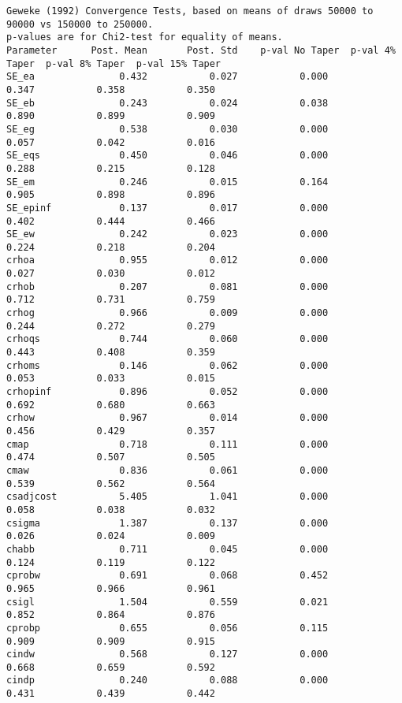 \documentclass[]{article}
\begin{document}
\begin{verbatim}
Geweke (1992) Convergence Tests, based on means of draws 50000 to 90000 vs 150000 to 250000.
p-values are for Chi2-test for equality of means.
Parameter 	   Post. Mean 	    Post. Std 	 p-val No Taper	 p-val 4% Taper	 p-val 8% Taper	 p-val 15% Taper
SE_ea      	        0.432 	        0.027 	        0.000	        0.347	        0.358	        0.350
SE_eb      	        0.243 	        0.024 	        0.038	        0.890	        0.899	        0.909
SE_eg      	        0.538 	        0.030 	        0.000	        0.057	        0.042	        0.016
SE_eqs     	        0.450 	        0.046 	        0.000	        0.288	        0.215	        0.128
SE_em      	        0.246 	        0.015 	        0.164	        0.905	        0.898	        0.896
SE_epinf   	        0.137 	        0.017 	        0.000	        0.402	        0.444	        0.466
SE_ew      	        0.242 	        0.023 	        0.000	        0.224	        0.218	        0.204
crhoa      	        0.955 	        0.012 	        0.000	        0.027	        0.030	        0.012
crhob      	        0.207 	        0.081 	        0.000	        0.712	        0.731	        0.759
crhog      	        0.966 	        0.009 	        0.000	        0.244	        0.272	        0.279
crhoqs     	        0.744 	        0.060 	        0.000	        0.443	        0.408	        0.359
crhoms     	        0.146 	        0.062 	        0.000	        0.053	        0.033	        0.015
crhopinf   	        0.896 	        0.052 	        0.000	        0.692	        0.680	        0.663
crhow      	        0.967 	        0.014 	        0.000	        0.456	        0.429	        0.357
cmap       	        0.718 	        0.111 	        0.000	        0.474	        0.507	        0.505
cmaw       	        0.836 	        0.061 	        0.000	        0.539	        0.562	        0.564
csadjcost  	        5.405 	        1.041 	        0.000	        0.058	        0.038	        0.032
csigma     	        1.387 	        0.137 	        0.000	        0.026	        0.024	        0.009
chabb      	        0.711 	        0.045 	        0.000	        0.124	        0.119	        0.122
cprobw     	        0.691 	        0.068 	        0.452	        0.965	        0.966	        0.961
csigl      	        1.504 	        0.559 	        0.021	        0.852	        0.864	        0.876
cprobp     	        0.655 	        0.056 	        0.115	        0.909	        0.909	        0.915
cindw      	        0.568 	        0.127 	        0.000	        0.668	        0.659	        0.592
cindp      	        0.240 	        0.088 	        0.000	        0.431	        0.439	        0.442

\end{verbatim}
\end{document}
